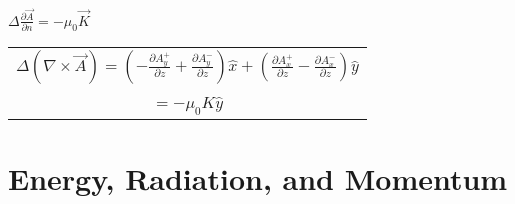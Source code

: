 \documentclass[12pt]{article}
\begin{document}
\begin{minipage}[t]{.55\textwidth}
	\hfill \break \\ 
	\( \boxed{ \Delta \frac{\partial \vec{A}}{\partial n} = -\mu_0 \vec{K} } \) \ \ \ 
	\begin{tabular}{|m{1.5cm} c c}
		\multicolumn{3}{|c}{
			\( \displaystyle \Delta ( \nabla \times \vec{A} )
			= \left( - \frac{\partial A_y^+}{\partial z} + \frac{\partial A_y^-}{\partial z} \right) \hat{x}
			+ \left( \frac{\partial A_x^+}{\partial z} - \frac{\partial A_x^-}{\partial z} \right) \hat{y} \)
		} \\ \\
		 & \( = -\mu_0 K \hat{y} \) & 
	\end{tabular}
\end{minipage}

\newpage
\section{Energy, Radiation, and Momentum}

\end{document}
